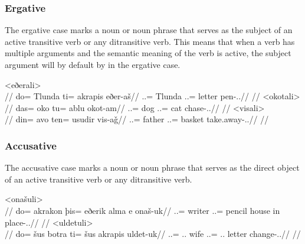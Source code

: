 \subsubsection{Ergative}
\label{subsubsec:tvk-nouns-ergative}

The ergative case marks a noun or noun phrase that serves as the subject of an active transitive verb or any ditransitive verb. This means that when a verb has multiple arguments and the semantic meaning of the verb is active, the subject argument will by default by in the ergative case.

	\a<eðerali>\begingl
		\glpreamble{}\\
		//
		\gla do= Tlunda ti= akrapis eðer-aš//
		\glb \An.\Sg.\Erg= Tlunda \In.\Sg.\Acc= letter pen-\Ind.\Npst.\Rtsp//
		\glft{}//
	\endgl
	\a<okotali>\begingl
		\glpreamble{}\\
		//
		\gla das= oko tu= ablu okot-am//
		\glb \An.\Pc.\Erg= dog \An.\Sg.\Acc= cat chase-\Ind.\Pst.\Ipfv//
		\glft{}//
	\endgl
	\a<visali>\begingl
		\glpreamble{}\\
		//
		\gla din= avo ten= usudir vis-aǧ//
		\glb \An.\Pl.\Erg= father \In.\Pl.\Acc= basket take.away-\Ind.\Pst.\Rtsp//
		\glft{}//
	\endgl
\xe

\subsubsection{Accusative}
\label{subsubsec:tvk-nouns-accusative}

The accusative case marks a noun or noun phrase that serves as the direct object of an active transitive verb or any ditransitive verb.

	\a<onašuli>\begingl
		\glpreamble{}\\
		//
		\gla do= akrakon þis= eðerik alma e onaš-uk//
		\glb \An.\Sg.\Erg= writer \In.\Pc.\Acc= pencil house in place-\Ind.\Pst.\Pfv//
		\glft{}//
	\endgl
	\a<uldetuli>\begingl
		\glpreamble{}\\
		//
		\gla do= šus botra ti= šus akrapis uldet-uk//
		\glb \An.\Sg.\Erg= \Tpp.\An.\Gen{} wife \In.\Sg.\Acc= \Tpp.\An.\Gen{} letter change-\Ind.\Pst.\Pfv//
		\glft{}//
	\endgl
\xe

